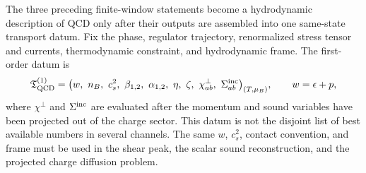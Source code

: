 \begin{controlledapproximation}
\label{ca:qcd-transport-closure-window}
The three preceding finite-window statements become a hydrodynamic
description of QCD only after their outputs are assembled into one
same-state transport datum.  Fix the phase, regulator trajectory,
renormalized stress tensor and currents, thermodynamic constraint, and
hydrodynamic frame.  The first-order datum is
\begin{equation}
  \mathfrak T_{\rm QCD}^{(1)}
  =
  \bigl(
    w,\ n_B,\ c_s^2,\ \beta_{1,2},\ \alpha_{1,2},\
    \eta,\ \zeta,\ \chi^{\perp}_{ab},\ \Sigma_{ab}^{\rm inc}
  \bigr)_{(T,\mu_B)},
  \qquad
  w=\epsilon+p ,
  \label{eq:qcd-first-order-transport-datum}
\end{equation}
where \(\chi^{\perp}\) and \(\Sigma^{\rm inc}\) are evaluated after the
momentum and sound variables have been projected out of the charge sector.
This datum is not the disjoint list of best available numbers in several
channels.  The same \(w\), \(c_s^2\), contact convention, and frame must be
used in the shear peak, the scalar sound reconstruction, and the projected
charge diffusion problem.


\end{controlledapproximation}
